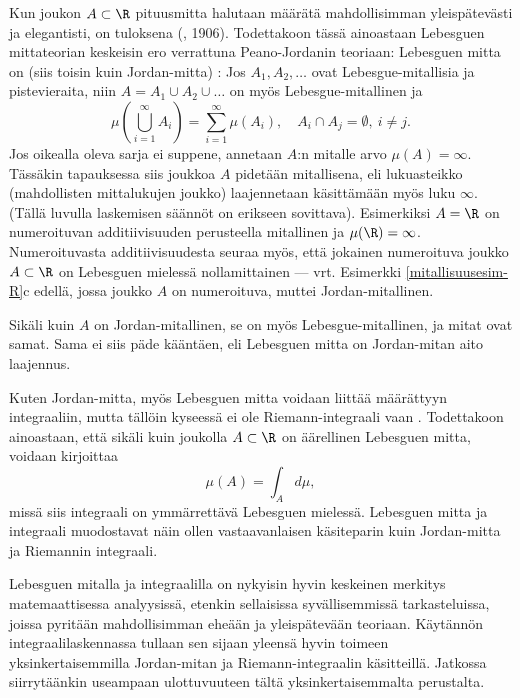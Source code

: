 Kun joukon $A\subset\R$ pituusmitta halutaan määrätä mahdollisimman yleispätevästi ja 
elegantisti, on tuloksena  (, 1906). Todettakoon tässä
ainoastaan Lebesguen mittateorian keskeisin ero verrattuna Peano-Jordanin teoriaan: Lebesguen 
mitta on (siis toisin kuin Jordan-mitta) : Jos $A_1,A_2,\ldots$
ovat Lebesgue-mitallisia ja pistevieraita, niin $A=A_1\cup A_2\cup\ldots$ on myös 
Lebesgue-mitallinen ja
\[
\mu(\bigcup_{i=1}^\infty A_i)=\sum_{i=1}^\infty \mu(A_i),\quad A_i\cap A_j=\emptyset, \ i\neq j.
\]
Jos oikealla oleva sarja ei suppene, annetaan $A$:n mitalle arvo $\mu(A)=\infty$. Tässäkin 
tapauksessa siis joukkoa $A$ pidetään mitallisena, eli lukuasteikko (mahdollisten mittalukujen
joukko) laajennetaan käsittämään myös luku $\infty$. (Tällä luvulla laskemisen säännöt on 
erikseen sovittava). Esimerkiksi $A=\R$ on numeroituvan additiivisuuden perusteella mitallinen
ja $\mu(\R)=\infty$. Numeroituvasta additiivisuudesta seuraa myös, että jokainen numeroituva 
joukko $A\subset\R$ on Lebesguen mielessä nollamittainen --- vrt. Esimerkki 
\ref{mitallisuusesim-R}c edellä, jossa joukko $A$ on numeroituva, muttei Jordan-mitallinen.

Sikäli kuin $A$ on Jordan-mitallinen, se on myös Lebesgue-mitallinen, ja mitat ovat samat. Sama
ei siis päde kääntäen, eli Lebesguen mitta on Jordan-mitan aito laajennus.

Kuten Jordan-mitta, myös Lebesguen mitta voidaan liittää määrättyyn integraaliin, mutta tällöin
kyseessä ei ole Riemann-integraali vaan . Todettakoon ainoastaan, että
sikäli kuin joukolla $A\subset\R$ on äärellinen Lebesguen mitta, voidaan kirjoittaa
\[
\mu(A)=\int_A d\mu,
\]
missä siis integraali on ymmärrettävä Lebesguen mielessä. Lebesguen mitta ja integraali 
muodostavat näin ollen vastaavanlaisen käsiteparin kuin Jordan-mitta ja Riemannin integraali.

Lebesguen mitalla ja integraalilla on nykyisin hyvin keskeinen merkitys matemaattisessa 
analyysissä, etenkin sellaisissa syvällisemmissä tarkasteluissa, joissa pyritään mahdollisimman
eheään ja yleispätevään teoriaan. Käytännön integraalilaskennassa tullaan sen sijaan yleensä 
hyvin toimeen yksinkertaisemmilla Jordan-mitan ja Riemann-integraalin käsitteillä. Jatkossa 
siirrytäänkin useampaan ulottuvuuteen tältä yksinkertaisemmalta perustalta.

